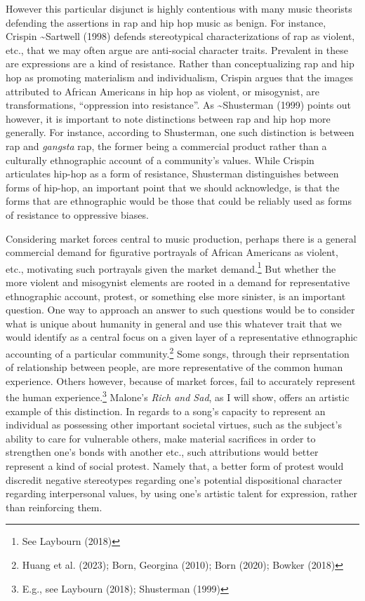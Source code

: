 \documentclass[12pt]{book}
\theoremstyle{definition}
\theoremstyle{remark}
\begin{document}
However this particular disjunct is highly contentious with many music theorists defending the assertions in rap and hip hop music as benign. For instance, Crispin \textasciitilde{}Sartwell (1998) defends stereotypical characterizations of rap as violent, etc., that we may often argue are anti-social character traits. Prevalent in these are expressions are a kind of resistance. Rather than conceptualizing rap and hip hop as promoting materialism and individualism, Crispin argues that the images attributed to African Americans in hip hop as violent, or misogynist, are transformations, ``oppression into resistance''. As \textasciitilde{}Shusterman (1999) points out however, it is important to note distinctions between rap and hip hop more generally. For instance, according to Shusterman, one such distinction is between rap and \emph{gangsta} rap, the former being a commercial product rather than a culturally ethnographic account of a community's values. While Crispin articulates hip-hop as a form of resistance, Shusterman distinguishes between forms of hip-hop, an important point that we should acknowledge, is that the forms that are ethnographic would be those that could be reliably used as forms of resistance to oppressive biases.

Considering market forces central to music production, perhaps there is a general commercial demand for figurative portrayals of African Americans as violent, etc., motivating such portrayals given the market demand.\footnote{See Laybourn (2018)} But whether the more violent and misogynist elements are rooted in a demand for representative ethnographic account, protest, or something else more sinister, is an important question. One way to approach an answer to such questions would be to consider what is unique about humanity in general and use this whatever trait that we would identify as a central focus on a given layer of a representative ethnographic accounting of a particular community.\footnote{Huang et al. (2023); Born, Georgina (2010); Born (2020); Bowker (2018)} Some songs, through their reprsentation of relationship between people, are more representative of the common human experience. Others however, because of market forces, fail to accurately represent the human experience.\footnote{E.g., see Laybourn (2018); Shusterman (1999)} Malone's \emph{Rich and Sad}, as I will show, offers an artistic example of this distinction. In regards to a song's capacity to represent an individual as possessing other important societal virtues, such as the subject's ability to care for vulnerable others, make material sacrifices in order to strengthen one's bonds with another etc., such attributions would better represent a kind of social protest. Namely that, a better form of protest would discredit negative stereotypes regarding one's potential dispositional character regarding interpersonal values, by using one's artistic talent for expression, rather than reinforcing them.
\end{document}
